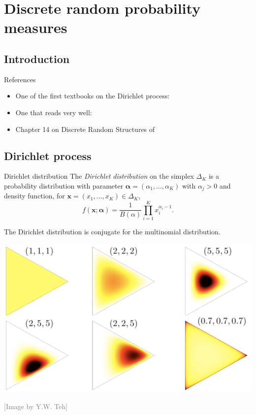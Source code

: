 \section{Discrete random probability measures}


\subsection{Introduction}


\begin{frame}{References}
\begin{itemize}
	\item \alert{One of the first textbooks on the Dirichlet process}: 
	\item \alert{One that reads very well}: 
	\item \alert{Chapter 14} on Discrete Random Structures of 
\end{itemize}
\end{frame}


\subsection{Dirichlet process}

\begin{frame}{Dirichlet distribution}
	The \textit{Dirichlet distribution} on the simplex $\Delta_K$ is a probability distribution with parameter $\boldsymbol{\alpha} = (\alpha_1,\ldots,\alpha_K)$ with $\alpha_j>0$ and density function, for $\boldsymbol{x} = (x_1, \ldots, x_K)\in \Delta_K$,
\begin{displaymath}
f(\boldsymbol{x}; \boldsymbol{\alpha}) = \frac{1}{B(\alpha)}\prod_{i=1}^Kx_i^{\alpha_i - 1}.
\end{displaymath}

The Dirichlet distribution is conjugate for the multinomial distribution. 

\begin{center}
\includegraphics[width = .6\textwidth]{figures_julyan/intro_DP/dirichlet_distribution}
\end{center}
\hfill\textcolor{gray}{[Image by Y.W. Teh]}
\end{frame}


